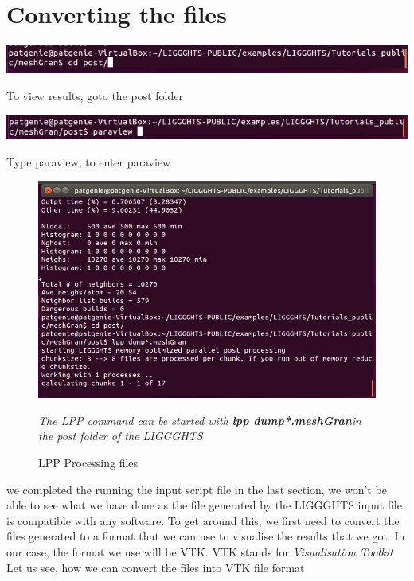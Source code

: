\documentclass{tufte-book} %
\begin{document}
 \section[Converting the files]{Converting the files}
 \begin{marginfigure}
   \includegraphics[width=\linewidth]{graphics/Screenshot/Con1.png}
   \caption{To view results, goto the post folder}
  
   \includegraphics[width=\linewidth]{graphics/Screenshot/Con4.png}
   \caption{Type paraview, to enter paraview}
 \end{marginfigure}
 \begin{figure}
 \includegraphics[width=\linewidth]{graphics/Screenshot/Con2.png}
 \caption{LPP Processing files}
 \textit{The LPP command can be started with \textbf{lpp dump*.meshGran}in the post folder of the LIGGGHTS}
 \end{figure}
 \begin{fullwidth}
    we completed the running the input script file in the last section, we won't be able to see what we have done as the file generated by the LIGGGHTS input file is compatible with any software. To get around this, we first need to convert the files generated to a format that we can use to visualise the results that we got. In our case, the format we use will be VTK. VTK stands for \textit{Visualisation Toolkit}
   Let us see, how we can convert the files into VTK file format
 \end{fullwidth}
\end{document}
